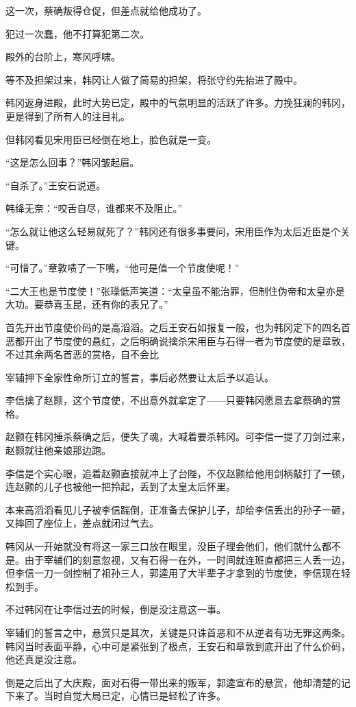 这一次，蔡确叛得仓促，但差点就给他成功了。

犯过一次蠢，他不打算犯第二次。

殿外的台阶上，寒风呼啸。

等不及担架过来，韩冈让人做了简易的担架，将张守约先抬进了殿中。

韩冈返身进殿，此时大势已定，殿中的气氛明显的活跃了许多。力挽狂澜的韩冈，更是得到了所有人的注目礼。

但韩冈看见宋用臣已经倒在地上，脸色就是一变。

“这是怎么回事？”韩冈皱起眉。

“自杀了。”王安石说道。

韩绛无奈：“咬舌自尽，谁都来不及阻止。”

“怎么就让他这么轻易就死了？”韩冈还有很多事要问，宋用臣作为太后近臣是个关键。

“可惜了。”章敦啧了一下嘴，“他可是值一个节度使呢！”

“二大王也是节度使！”张璪低声笑道：“太皇虽不能治罪，但制住伪帝和太皇亦是大功。要恭喜玉昆，还有你的表兄了。”

首先开出节度使价码的是高滔滔。之后王安石如报复一般，也为韩冈定下的四名首恶都开出了节度使的悬红，之后明确说擒杀宋用臣与石得一者为节度使的是章敦，不过其余两名首恶的赏格，自不会比

宰辅押下全家性命所订立的誓言，事后必然要让太后予以追认。

李信擒了赵颢，这个节度使，不出意外就拿定了——只要韩冈愿意去拿蔡确的赏格。

赵颢在韩冈捶杀蔡确之后，便失了魂，大喊着要杀韩冈。可李信一提了刀剑过来，赵颢就往他亲娘那边跑。

李信是个实心眼，追着赵颢直接就冲上了台陛，不仅赵颢给他用剑柄敲打了一顿，连赵颢的儿子也被他一把拎起，丢到了太皇太后怀里。

本来高滔滔看见儿子被李信踹倒，正准备去保护儿子，却给李信丢出的孙子一砸，又摔回了座位上，差点就闭过气去。

韩冈从一开始就没有将这一家三口放在眼里，没臣子理会他们，他们就什么都不是。由于宰辅们的刻意忽视，又有石得一在外，一时间就连班直都把三人丢一边，但李信一刀一剑控制了祖孙三人，郭逵用了大半辈子才拿到的节度使，李信现在轻松到手。

不过韩冈在让李信过去的时候，倒是没注意这一事。

宰辅们的誓言之中，悬赏只是其次，关键是只诛首恶和不从逆者有功无罪这两条。韩冈当时表面平静，心中可是紧张到了极点，王安石和章敦到底开出了什么价码，他还真是没注意。

倒是之后出了大庆殿，面对石得一带出来的叛军，郭逵宣布的悬赏，他却清楚的记下来了。当时自觉大局已定，心情已是轻松了许多。

